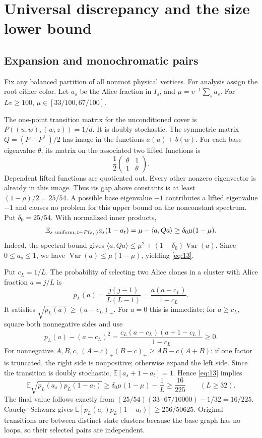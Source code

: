 \documentclass[11pt]{article}
\theoremstyle{definition}
\theoremstyle{remark}
\numberwithin{equation}{section}
\begin{document}
\section{Universal discrepancy and the size lower bound}\label{sec:discrepancy}

\subsection{Expansion and monochromatic pairs}\label{sub:mean}
Fix any balanced partition of all nonroot physical vertices.
For analysis assign the root either color. Let \(a_s\) be the
Alice fraction in \(I_s\), and \(\mu=v^{-1}\sum_s a_s\).
For \(Lv\ge100\), \(\mu\in[33/100,67/100]\).

The one-point transition matrix for the unconditioned cover is
\(P((u,w),(w,z))=1/d\). It is doubly stochastic.
The symmetric matrix \(Q=(P+P^\top)/2\) has image in the
functions \(a(u)+b(w)\). For each base eigenvalue \(\theta\),
its matrix on the associated two lifted functions is
\[
                     \frac12
                     \begin{pmatrix}\theta&1\\1&\theta\end{pmatrix}.
\]
Dependent lifted functions are quotiented out. Every other nonzero
eigenvector is already in this image. Thus its gap above constants
is at least \((1-\rho)/2=25/54\). A possible base eigenvalue
\(-1\) contributes a lifted eigenvalue \(-1\) and causes no
problem for this upper bound on the nonconstant spectrum.
Put \(\delta_0=25/54\). With normalized inner products,
\begin{equation}\label{eq:13}
\mathbb E_{s\ {\rm uniform},\,t\sim P(s,\cdot)} a_s(1-a_t)
       =\mu-\langle a,Qa\rangle
       \ge\delta_0\mu(1-\mu).
\end{equation}
Indeed, the spectral bound gives
\(\langle a,Qa\rangle\le\mu^2+(1-\delta_0)\operatorname{Var}(a)\).
Since \(0\le a_s\le1\), we have
\(\operatorname{Var}(a)\le\mu(1-\mu)\), yielding \eqref{eq:13}.

Put \(c_L=1/L\). The probability of selecting two Alice clones
in a cluster with Alice fraction \(a=j/L\) is
\[
             p_L(a)=\frac{j(j-1)}{L(L-1)}
                    =\frac{a(a-c_L)}{1-c_L}.
\]
It satisfies \(\sqrt{p_L(a)}\ge(a-c_L)_+\).
For \(a=0\) this is immediate; for \(a\ge c_L\), square both
nonnegative sides and use
\[
 p_L(a)-(a-c_L)^2
     =\frac{c_L(a-c_L)(a+1-c_L)}{1-c_L}\ge0.
\]
For nonnegative \(A,B,c\),
\((A-c)_+(B-c)_+\ge AB-c(A+B)\): if one factor is truncated,
the right side is nonpositive; otherwise expand the left side.
Since the transition is doubly stochastic,
\(\mathbb E[a_s+1-a_t]=1\). Hence \eqref{eq:13} implies
\[
 \mathbb E\sqrt{p_L(a_s)p_L(1-a_t)}
                 \ge\delta_0\mu(1-\mu)-\frac1L
                 \ge\frac{16}{225}\qquad(L\ge32).
\]
The final value follows exactly from
\((25/54)(33\cdot67/10000)-1/32=16/225\).
Cauchy--Schwarz gives
\(\mathbb E[p_L(a_s)p_L(1-a_t)]\ge256/50625\).
Original transitions are between distinct state clusters because
the base graph has no loops, so their selected pairs are independent.
\end{document}
